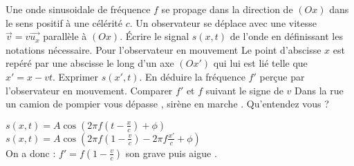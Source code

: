 \begin{Exercise}[title=Effet Doppler]
	Une onde sinusoidale de fréquence $f$ se propage dans la direction de $(Ox)$ dans le sens positif à une célérité $c$. Un observateur se déplace avec une vitesse $\vec{v}=v\vec{u_x}$ parallèle à $(Ox)$.
	\Question Écrire le signal $s(x,t)$ de l'onde en définissant les notations nécessaire.
	\Question Pour l'observateur en mouvement Le point d'abscisse $x$ est repéré par une abscisse le long d'un axe $(Ox')$ qui lui est lié telle que $x'=x-vt$. Exprimer $s(x',t)$.
	\Question En déduire la fréquence $f'$ perçue par l'observateur en mouvement. Comparer $f'$ et $f$ suivant le signe de $v$
	\Question Dans la rue un camion de pompier vous dépasse , sirène en marche . Qu'entendez vous ?
\end{Exercise}
\begin{Answer}
	\Question $s(x,t)= A\cos(2\pi f (t-\frac{x}{c})+\phi)$
	\Question $s(x,t)= A\cos(2\pi f (1-\frac{v}{c})-2\pi f \frac{x'}{c}+\phi)$ \\
	\Question On a donc : $f' = f(1-\frac{v}{c})$
	\Question son grave puis aigue .
\end{Answer}
